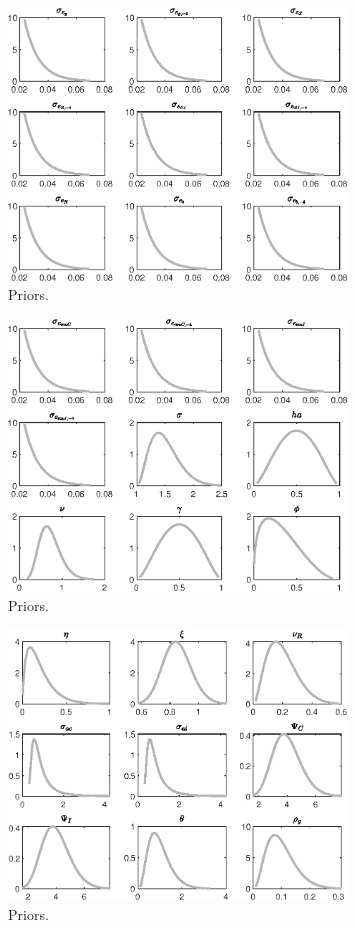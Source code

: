  
\begin{figure}[H]
\centering
\includegraphics[width=0.80\textwidth]{BRS_sectoral_wo_demand_shocks/graphs/BRS_sectoral_wo_demand_shocks_Priors1}
\caption{Priors.}\label{Fig:Priors:1}
\end{figure}
\begin{figure}[H]
\centering
\includegraphics[width=0.80\textwidth]{BRS_sectoral_wo_demand_shocks/graphs/BRS_sectoral_wo_demand_shocks_Priors2}
\caption{Priors.}\label{Fig:Priors:2}
\end{figure}
\begin{figure}[H]
\centering
\includegraphics[width=0.80\textwidth]{BRS_sectoral_wo_demand_shocks/graphs/BRS_sectoral_wo_demand_shocks_Priors3}
\caption{Priors.}\label{Fig:Priors:3}
\end{figure}
